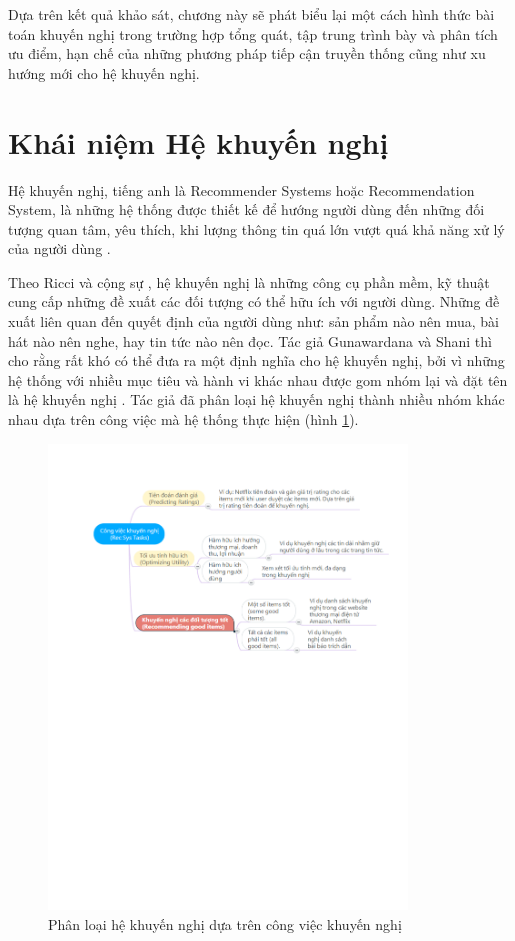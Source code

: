 Dựa trên kết quả khảo sát, chương này sẽ phát biểu lại một cách hình thức bài toán khuyến nghị trong trường hợp tổng quát, tập trung trình bày và phân tích ưu điểm, hạn chế của những phương pháp tiếp cận truyền thống cũng như xu hướng mới cho hệ khuyến nghị.

\section{Khái niệm Hệ khuyến nghị}
Hệ khuyến nghị, tiếng anh là Recommender Systems hoặc Recommendation System, là những hệ thống được thiết kế để hướng người dùng đến những đối tượng quan tâm, yêu thích, khi lượng thông tin quá lớn vượt quá khả năng xử lý của người dùng \cite{PaulResnick:1997_RecSystems_ACM, Robin:2002:HybridRS_Survey}. 

Theo Ricci và cộng sự \cite{RicciFrancesco:2011}, hệ khuyến nghị là những công cụ phần mềm, kỹ thuật cung cấp những đề xuất các đối tượng có thể hữu ích với người dùng. Những đề xuất liên quan đến quyết định của người dùng như: sản phẩm nào nên mua, bài hát nào nên nghe, hay tin tức nào nên đọc. Tác giả Gunawardana và Shani thì cho rằng rất khó có thể đưa ra một định nghĩa cho hệ khuyến nghị, bởi vì những hệ thống với nhiều mục tiêu và hành vi khác nhau được gom nhóm lại và đặt tên là hệ khuyến nghị \cite{GunawardanaS09}. Tác giả đã phân loại hệ khuyến nghị thành nhiều nhóm khác nhau dựa trên công việc mà hệ thống thực hiện (hình \ref{fig:figure_1_0}).

\begin{figure}[ht]
\begin{center}
\advance\leftskip-3cm
\advance\rightskip-3cm
  \includegraphics[width=0.85\textwidth]{Figure_1_0.pdf}
  \caption{Phân loại hệ khuyến nghị dựa trên công việc khuyến nghị}\label{fig:figure_1_0}
\end{center}
\end{figure}

